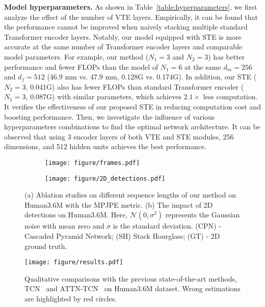 \documentclass[journal]{IEEEtran}
\begin{document}
\textbf{Model hyperparameters.}
As shown in Table~\ref{table:hyperparameters}, we first analyze the effect of the number of VTE layers. 
Empirically, it can be found that the performance cannot be improved when naively stacking multiple standard Transformer encoder layers. 
Notably, our model equipped with STE is more accurate at the same number of Transformer encoder layers and comparable model parameters. 
For example, our method ($N_{1}=3$ and $N_{2}=3$) has better performance and fewer FLOPs than the model of $N_{1}=6$ at the same $d_{m} = 256$ and $d_{f} = 512$ (46.9 mm vs. 47.9 mm, 0.128G vs. 0.174G). 
In addition, our STE ($N_{2}=3$, 0.041G) also has fewer FLOPs than standard Transformer encoder ($N_{1}=3$, 0.087G) with similar parameters, which achieves $2.1\times$ less computation. 
It verifies the effectiveness of our proposed STE in reducing computation cost and boosting performance. 
Then, we investigate the influence of various hyperparameters combinations to find the optimal network architecture. 
It can be observed that using 3 encoder layers of both VTE and STE modules, 256 dimensions, and 512 hidden units achieves the best performance. 

\begin{figure}[tb]
   \centering
   \begin{subfigure}[htb]{0.241\textwidth}
      \texttt{[image: figure/frames.pdf]}
      \caption{}
      \label{fig:frames}
   \end{subfigure}
   \begin{subfigure}[htb]{0.241\textwidth}
      \texttt{[image: figure/2D\_detections.pdf]}
      \caption{}
      \label{fig:2D_detections}
   \end{subfigure}
   \caption
   {
      (a) Ablation studies on different sequence lengths of our method on Human3.6M with the MPJPE metric. 
      (b) The impact of 2D detections on Human3.6M. 
      Here, $\mathcal{N}(0, \sigma^2)$ represents the Gaussian noise with mean zero and $\sigma$ is the standard deviation. 
      (CPN) - Cascaded Pyramid Network; (SH) Stack Hourglass; (GT) - 2D ground truth.  
   }
   \label{fig:frames and 2D}
\end{figure}

\begin{figure*}[htb]
   \centering
   \texttt{[image: figure/results.pdf]}
   \caption
   {
      Qualitative comparisons with the previous state-of-the-art methods, TCN~\cite{pavllo20193d} and ATTN-TCN~\cite{liu2020attention} on Human3.6M dataset. 
      Wrong estimations are highlighted by red circles. 
   }
   \label{fig:results}
\end{figure*}
\end{document}
